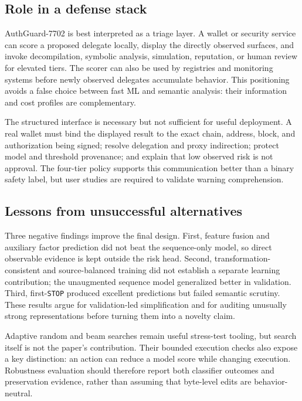 \documentclass[conference]{IEEEtran}
\newcommand{\system}{AuthGuard-7702}
\newcommand{\code}[1]{\texttt{#1}}
\begin{document}
\subsection{Role in a defense stack}

\system{} is best interpreted as a triage layer. A wallet or security service can score a proposed
delegate locally, display the directly observed surfaces, and invoke decompilation, symbolic
analysis, simulation, reputation, or human review for elevated tiers. The scorer can also be used
by registries and monitoring systems before newly observed delegates accumulate behavior. This
positioning avoids a false choice between fast ML and semantic analysis: their information and
cost profiles are complementary.

The structured interface is necessary but not sufficient for useful deployment. A real wallet
must bind the displayed result to the exact chain, address, block, and authorization being signed;
resolve delegation and proxy indirection; protect model and threshold provenance; and explain
that low observed risk is not approval. The four-tier policy supports this communication better
than a binary safety label, but user studies are required to validate warning comprehension.

\subsection{Lessons from unsuccessful alternatives}

Three negative findings improve the final design. First, feature fusion and auxiliary factor
prediction did not beat the sequence-only model, so direct observable evidence is kept outside
the risk head. Second, transformation-consistent and source-balanced training did not establish a
separate learning contribution; the unaugmented sequence model generalized better in validation.
Third, first-\code{STOP} produced excellent predictions but failed semantic scrutiny. These
results argue for validation-led simplification and for auditing unusually strong representations
before turning them into a novelty claim.

Adaptive random and beam searches remain useful stress-test tooling, but search itself is not the
paper's contribution. Their bounded execution checks also expose a key distinction: an action can
reduce a model score while changing execution. Robustness evaluation should therefore report both
classifier outcomes and preservation evidence, rather than assuming that byte-level edits are
behavior-neutral.
\end{document}

